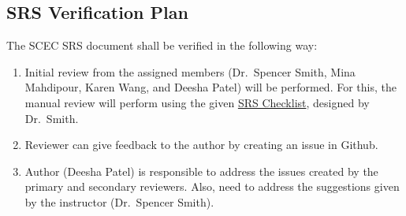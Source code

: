 \documentclass[12pt, titlepage]{article}
\begin{document}
\begin{center}
\begin{table}[h]
\caption{Verification and validation team} 
\label{verification_validation}
\end{table}
\end{center}

\subsection{SRS Verification Plan}
\label{srs_verification_plan}

The SCEC SRS document shall be verified in the following way: 

\begin{enumerate}

\item Initial review from the assigned members (Dr.\ Spencer Smith, Mina Mahdipour, Karen Wang, and Deesha Patel) will be performed. For this, the manual review will perform using the given \href{https://github.com/smiths/capTemplate/blob/9251702fdcb9800c59f6ed3d11d91e2bd62fca6d/docs/Checklists/SRS-Checklist.pdf}{SRS Checklist}, designed by Dr.\ Smith. 

\item Reviewer can give feedback to the author by creating an issue in Github. 

\item Author (Deesha Patel) is responsible to address the issues created by the primary and secondary reviewers. Also, need to address the suggestions given by the instructor (Dr.\ Spencer Smith).  

\end{enumerate}
\end{document}
